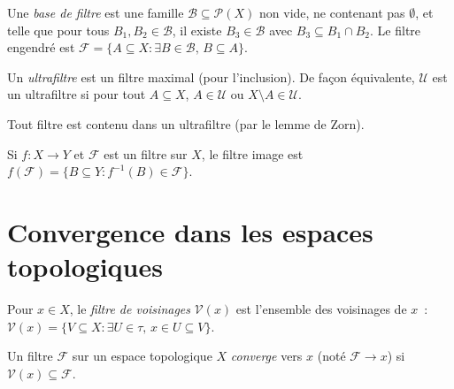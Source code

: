 \begin{definition}
Une \emph{base de filtre} est une famille $\mathcal{B} \subseteq \mathcal{P}(X)$ non vide,
ne contenant pas $\emptyset$, et telle que pour tous $B_1, B_2 \in \mathcal{B}$, il existe
$B_3 \in \mathcal{B}$ avec $B_3 \subseteq B_1 \cap B_2$. Le filtre engendr\'e est
$\mathcal{F} = \{A \subseteq X : \exists B \in \mathcal{B},\, B \subseteq A\}$.
\end{definition}

\begin{definition}[Ultrafiltre]
Un \emph{ultrafiltre} est un filtre maximal (pour l'inclusion). De fa\c{c}on \'equivalente,
$\mathcal{U}$ est un ultrafiltre si pour tout $A \subseteq X$, $A \in \mathcal{U}$ ou
$X \setminus A \in \mathcal{U}$.
\end{definition}

\begin{theoreme}
Tout filtre est contenu dans un ultrafiltre (par le lemme de Zorn).
\end{theoreme}

\begin{definition}
Si $f\colon X \to Y$ et $\mathcal{F}$ est un filtre sur $X$, le filtre image est
$f(\mathcal{F}) = \{B \subseteq Y : f^{-1}(B) \in \mathcal{F}\}$.
\end{definition}

\section{Convergence dans les espaces topologiques}

\begin{definition}
Pour $x \in X$, le \emph{filtre de voisinages} $\mathcal{V}(x)$ est l'ensemble des
voisinages de $x$~: $\mathcal{V}(x) = \{V \subseteq X : \exists U \in \tau,\,
x \in U \subseteq V\}$.
\end{definition}

\begin{definition}
Un filtre $\mathcal{F}$ sur un espace topologique $X$ \emph{converge} vers $x$ (not\'e
$\mathcal{F} \to x$) si $\mathcal{V}(x) \subseteq \mathcal{F}$.
\end{definition}

